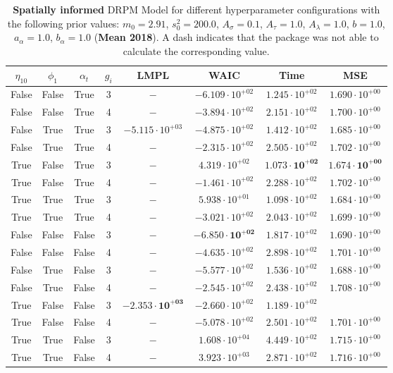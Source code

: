 \documentclass[12pt,a4paper]{article}
\begin{document}
\begin{table}
\centering\begin{tabular}{cccccccc}
\toprule
$\eta_{10}$ & $\phi_1$ & $\alpha_t$ & $g_i$ & LMPL & WAIC & Time & MSE \\
\midrule
False & False & True & 3 & $-$ & $-6.109 \cdot 10^{+02}$ & $1.245 \cdot 10^{+02}$ & $1.690 \cdot 10^{+00}$ \\
False & False & True & 4 & $-$ & $-3.894 \cdot 10^{+02}$ & $2.151 \cdot 10^{+02}$ & $1.700 \cdot 10^{+00}$ \\
False & True & True & 3 & $-5.115 \cdot 10^{+03}$ & $-4.875 \cdot 10^{+02}$ & $1.412 \cdot 10^{+02}$ & $1.685 \cdot 10^{+00}$ \\
False & True & True & 4 & $-$ & $-2.315 \cdot 10^{+02}$ & $2.505 \cdot 10^{+02}$ & $1.702 \cdot 10^{+00}$ \\
True & False & True & 3 & $-$ & $4.319 \cdot 10^{+02}$ & $\mathbf{1.073 \cdot 10^{+02}}$ & $\mathbf{1.674 \cdot 10^{+00}}$ \\
True & False & True & 4 & $-$ & $-1.461 \cdot 10^{+02}$ & $2.288 \cdot 10^{+02}$ & $1.702 \cdot 10^{+00}$ \\
True & True & True & 3 & $-$ & $5.938 \cdot 10^{+01}$ & $1.098 \cdot 10^{+02}$ & $1.684 \cdot 10^{+00}$ \\
True & True & True & 4 & $-$ & $-3.021 \cdot 10^{+02}$ & $2.043 \cdot 10^{+02}$ & $1.699 \cdot 10^{+00}$ \\
False & False & False & 3 & $-$ & $\mathbf{-6.850 \cdot 10^{+02}}$ & $1.817 \cdot 10^{+02}$ & $1.690 \cdot 10^{+00}$ \\
False & False & False & 4 & $-$ & $-4.635 \cdot 10^{+02}$ & $2.898 \cdot 10^{+02}$ & $1.701 \cdot 10^{+00}$ \\
False & True & False & 3 & $-$ & $-5.577 \cdot 10^{+02}$ & $1.536 \cdot 10^{+02}$ & $1.688 \cdot 10^{+00}$ \\
False & True & False & 4 & $-$ & $-2.545 \cdot 10^{+02}$ & $2.438 \cdot 10^{+02}$ & $1.708 \cdot 10^{+00}$ \\
True & False & False & 3 & $\mathbf{-2.353 \cdot 10^{+03}}$ & $-2.660 \cdot 10^{+02}$ & $1.189 \cdot 10^{+02}$ \\
True & False & False & 4 & $-$ & $-5.078 \cdot 10^{+02}$ & $2.501 \cdot 10^{+02}$ & $1.701 \cdot 10^{+00}$ \\
True & True & False & 3 & $-$ & $1.608 \cdot 10^{+04}$ & $4.449 \cdot 10^{+02}$ & $1.715 \cdot 10^{+00}$ \\
True & True & False & 4 & $-$ & $3.923 \cdot 10^{+03}$ & $2.871 \cdot 10^{+02}$ & $1.716 \cdot 10^{+00}$ \\
\bottomrule
\end{tabular}
\caption{\textbf{Spatially informed} DRPM Model for different hyperparameter configurations with the following prior values: $m_0 = 2.91$, $s_0^2 
= 200.0$, $A_\sigma = 0.1$, $A_\tau = 1.0$, $A_\lambda = 1.0$, $b = 1.0$, $a_\alpha = 1.0$, $b_\alpha = 1.0$ (\textbf{Mean 2018}).
A dash indicates that the package was not able to calculate the corresponding value.
}
\label{tab:DRPMExtensionMean2018}
\end{table}
\end{document}
